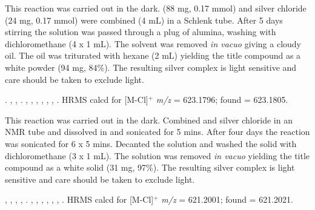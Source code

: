 This reaction was carried out in the dark.  \tBuThixantphos{} (88 mg, 0.17 mmol) and silver chloride (24 mg, 0.17 mmol) were combined  (4 mL) in a Schlenk tube.  After 5 days stirring the solution was passed through a plug of alumina, washing with dichloromethane (4 x 1 mL).  The solvent was removed \emph{in vacuo} giving a cloudy oil.  The oil was triturated with hexane (2 mL) yielding the title compound as a white powder (94 mg, 84\%).  The resulting silver complex is light sensitive and care should be taken to exclude light.

.
,
,
.
,
,
,
,
,
,
.
HRMS calcd for  [M-Cl]$^+$ \emph{m/z} = 623.1796; found = 623.1805.



This reaction was carried out in the dark.  Combined \tBusixantphos{} and silver chloride in an NMR tube and dissolved in  and sonicated for 5 mins.  After four days the reaction was sonicated for 6 x 5 mins.  Decanted the solution and washed the solid with dichloromethane (3 x 1 mL).  The solution was removed \emph{in vacuo} yielding the title compound as a white solid (31 mg, 97\%).  The resulting silver complex is light sensitive and care should be taken to exclude light.

,
,
,
,
.
,
,
,
,
,
,
.
HRMS calcd for  [M-Cl]$^+$ \emph{m/z} = 621.2001; found = 621.2021.

